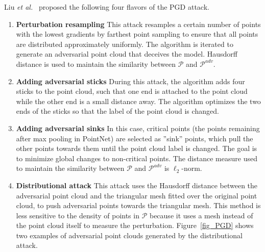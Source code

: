 \documentclass{ieeeaccess}
\def\etal{\textit{et al.}}
\begin{document}
Liu \etal~\cite{liu2020adversarial} proposed the following four flavors of the PGD attack.%

\begin{enumerate}
\item \textbf{Perturbation resampling} This attack resamples a certain number of points with the lowest gradients by farthest point sampling to ensure that all points are distributed approximately uniformly. The algorithm is iterated to generate an adversarial point cloud that deceives the model. Hausdorff distance is used to maintain the similarity between $\mathcal{P}$ and $\mathcal{P}^{adv}$.

\item \textbf{Adding adversarial sticks} During this attack, the algorithm adds four sticks to the point cloud, such that one end is attached to the point cloud while the other end is a small distance away. The algorithm optimizes the two ends of the sticks so that the label of the point cloud is changed. %

\item \textbf{Adding adversarial sinks} In this case, critical points (the points remaining after max pooling in PointNet) are selected as ''sink'' points, which pull the other points towards them until the point cloud label is changed. The goal is to minimize global changes to non-critical points. The distance measure used to maintain the similarity between $\mathcal{P}$ and $\mathcal{P}^{adv}$ is $\ell_2$-norm.

\item \textbf{Distributional attack} This attack uses the Hausdorff distance between the adversarial point cloud and the triangular mesh fitted over the original point cloud, to push adversarial points towards the triangular mesh. This method is less sensitive to the density of points in $\mathcal{P}$ because it uses a mesh instead of the point cloud itself to measure the perturbation. 
Figure~\ref{fig_PGD} shows two examples of adversarial point clouds generated by the distributional attack.
\end{enumerate}


\end{document}
